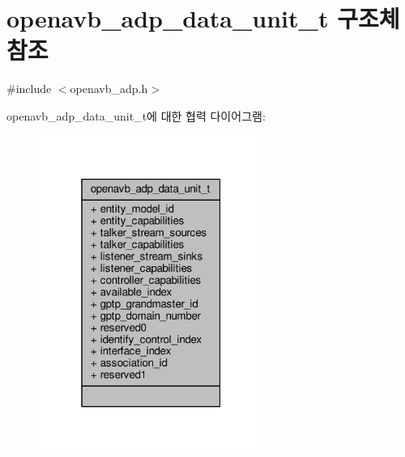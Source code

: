 \hypertarget{structopenavb__adp__data__unit__t}{}\section{openavb\+\_\+adp\+\_\+data\+\_\+unit\+\_\+t 구조체 참조}
\label{structopenavb__adp__data__unit__t}


{\ttfamily \#include $<$openavb\+\_\+adp.\+h$>$}



openavb\+\_\+adp\+\_\+data\+\_\+unit\+\_\+t에 대한 협력 다이어그램\+:
\nopagebreak
\begin{figure}[H]
\begin{center}
\leavevmode
\includegraphics[width=208pt]{structopenavb__adp__data__unit__t__coll__graph}
\end{center}
\end{figure}
